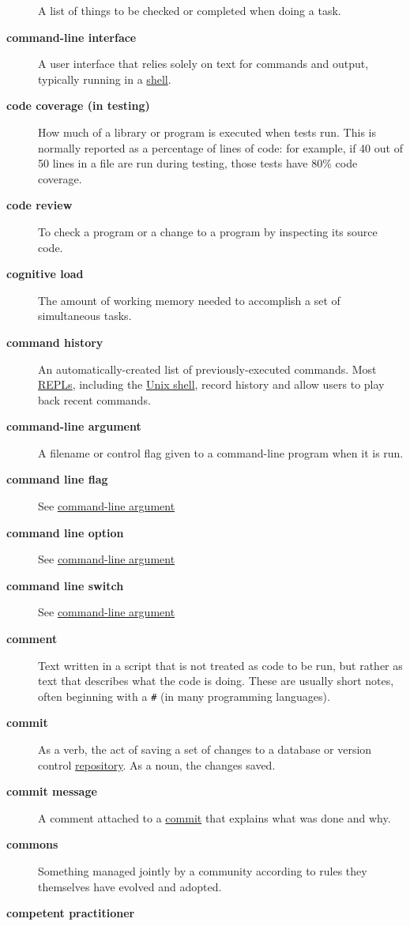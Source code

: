 \documentclass[
]{krantz}
\begin{document}
\begin{description}
A list of things to be checked or completed when doing a task.
\item[\textbf{command-line interface}]
A user interface that relies solely on text for commands and output, typically running in a \protect\hyperlink{shell}{shell}.
\item[\textbf{code coverage (in testing)}]
How much of a library or program is executed when tests run. This is normally reported as a percentage of lines of code: for example, if 40 out of 50 lines in a file are run during testing, those tests have 80\% code coverage.
\item[\textbf{code review}]
To check a program or a change to a program by inspecting its source code.
\item[\textbf{cognitive load}]
The amount of working memory needed to accomplish a set of simultaneous tasks.
\item[\textbf{command history}]
An automatically-created list of previously-executed commands. Most \protect\hyperlink{repl}{REPLs}, including the \protect\hyperlink{shell}{Unix shell}, record history and allow users to play back recent commands.
\item[\textbf{command-line argument}]
A filename or control flag given to a command-line program when it is run.
\item[\textbf{command line flag}]
See \protect\hyperlink{command_line_argument}{command-line argument}
\item[\textbf{command line option}]
See \protect\hyperlink{command_line_argument}{command-line argument}
\item[\textbf{command line switch}]
See \protect\hyperlink{command_line_argument}{command-line argument}
\item[\textbf{comment}]
Text written in a script that is not treated as code to be run, but rather as text that describes what the code is doing. These are usually short notes, often beginning with a \texttt{\#} (in many programming languages).
\item[\textbf{commit}]
As a verb, the act of saving a set of changes to a database or version control \protect\hyperlink{repository}{repository}. As a noun, the changes saved.
\item[\textbf{commit message}]
A comment attached to a \protect\hyperlink{commit}{commit} that explains what was done and why.
\item[\textbf{commons}]
Something managed jointly by a community according to rules they themselves have evolved and adopted.
\item[\textbf{competent practitioner}]

\end{description}
\end{document}
